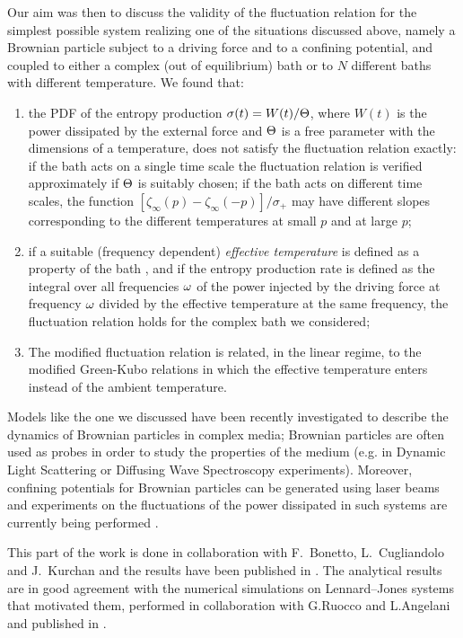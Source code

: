 \documentclass[pre,aps]{revtex4}
\newcommand{\eg}{e.g. }
\let\z=\zeta  \let\h=\eta   \let\th=\theta \let\k=\kappa \let\l=\lambda
\let\s=\sigma \let\t=\tau   \let\f=\varphi \let\c=\chi
\let\io=\infty
\begin{document}
Our aim was then to discuss the validity of the fluctuation relation for the simplest
possible system realizing one of the situations discussed above, namely a Brownian particle subject
to a driving force and to a confining potential, and coupled to either a complex (out of equilibrium)
bath or to $N$ different baths with different temperature.
We found that:
\begin{enumerate}
\item the PDF of the entropy production $\s(t) = W(t)/\Th$, where $W(t)$ is the power dissipated 
by the external force and $\Theta$ is a free parameter with the dimensions of a temperature,
does not satisfy the fluctuation relation exactly: 
if the bath acts on a single time scale 
the fluctuation relation is verified approximately if $\Theta$ is
suitably chosen; if the bath acts on different time scales, 
the function $[\z_\io(p)-\z_\io(-p)]/\s_+$ may have different slopes corresponding to the
different temperatures at small $p$ and at large $p$;
\item if a suitable (frequency dependent)
{\it effective temperature} is defined as a property of the bath \cite{Cu02}, 
and if the entropy production rate is defined as the integral over all frequencies $\omega$ of the power
injected by the driving force at frequency $\omega$ divided by the effective temperature at the same 
frequency, the fluctuation relation holds for the complex bath we considered;
\item The modified fluctuation relation is related, in the linear regime, to
  the modified Green-Kubo relations in which the effective temperature enters
  instead of the ambient temperature.
\end{enumerate}
Models like the one we discussed have been recently investigated \cite{AG04,PM04,Po04}
to describe the dynamics of Brownian particles in complex media;
Brownian particles are often used as probes in order to study the properties 
of the medium (\eg in Dynamic Light Scattering or Diffusing Wave Spectroscopy experiments).
Moreover, confining potentials for Brownian particles can be generated using laser beams 
\cite{Gr03} and experiments on the fluctuations of the power dissipated in such systems
are currently being performed \cite{AG04,WSMSE02}.

This part of the work is done in collaboration with F.~Bonetto, L.~Cugliandolo and J.~Kurchan 
and the results have been published in \cite{CKZ?}. The analytical results are in good 
agreement with the numerical simulations on Lennard--Jones systems that motivated them, 
performed in collaboration with G.Ruocco and L.Angelani and published in \cite{ZRA04b}.
\end{document}
